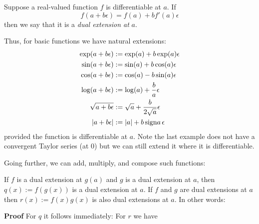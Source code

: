 \begin{definition} Suppose a real-valued function $f$ is differentiable at $a$. If
\[
f(a + b \ensuremath{\epsilon}) = f(a) + b f'(a) \ensuremath{\epsilon}
\]
then we say that it is a \emph{dual extension at} $a$.

Thus, for basic functions we have natural extensions:
\begin{align*}
\exp(a + b \ensuremath{\epsilon}) &:= \exp(a) + b \exp(a) \ensuremath{\epsilon} \\
\sin(a + b \ensuremath{\epsilon}) &:= \sin(a) + b \cos(a) \ensuremath{\epsilon} \\
\cos(a + b \ensuremath{\epsilon}) &:= \cos(a) - b \sin(a) \ensuremath{\epsilon} \\
\log(a + b \ensuremath{\epsilon}) &:= \log(a) + {b \over a} \ensuremath{\epsilon} \\
\sqrt{a+b \ensuremath{\epsilon}} &:= \sqrt{a} + {b \over 2 \sqrt{a}} \ensuremath{\epsilon} \\
|a + b \ensuremath{\epsilon}| &:= |a| + b\, {\rm sign} a\, \ensuremath{\epsilon}
\end{align*}
provided the function is differentiable at $a$. Note the last example does not have a convergent Taylor series (at 0) but we can still extend it where it is differentiable.

Going further, we can add, multiply, and compose such functions:

\begin{lemma} If $f$ is a dual extension at $g(a)$ and $g$ is a dual extension at $a$, then $q(x) := f(g(x))$ is a dual extension at $a$. If $f$ and $g$ are dual extensions at $a$ then  $r(x) := f(x) g(x)$ is also dual extensions at $a$. In other words:
\end{lemma}
\textbf{Proof} For $q$ it follows immediately:
For $r$ we have
\end{definition}

